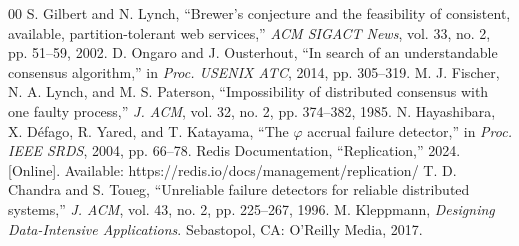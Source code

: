 \documentclass[conference]{IEEEtran}
\begin{document}
\begin{thebibliography}{00}
 S. Gilbert and N. Lynch, ``Brewer's conjecture and the feasibility of consistent, available, partition-tolerant web services,'' \textit{ACM SIGACT News}, vol. 33, no. 2, pp. 51--59, 2002.
 D. Ongaro and J. Ousterhout, ``In search of an understandable consensus algorithm,'' in \textit{Proc. USENIX ATC}, 2014, pp. 305--319.
 M. J. Fischer, N. A. Lynch, and M. S. Paterson, ``Impossibility of distributed consensus with one faulty process,'' \textit{J. ACM}, vol. 32, no. 2, pp. 374--382, 1985.
 N. Hayashibara, X. D\'efago, R. Yared, and T. Katayama, ``The $\varphi$ accrual failure detector,'' in \textit{Proc. IEEE SRDS}, 2004, pp. 66--78.
 Redis Documentation, ``Replication,'' 2024. [Online]. Available: https://redis.io/docs/management/replication/
 T. D. Chandra and S. Toueg, ``Unreliable failure detectors for reliable distributed systems,'' \textit{J. ACM}, vol. 43, no. 2, pp. 225--267, 1996.
 M. Kleppmann, \textit{Designing Data-Intensive Applications}. Sebastopol, CA: O'Reilly Media, 2017.
\end{thebibliography}
\end{document}
